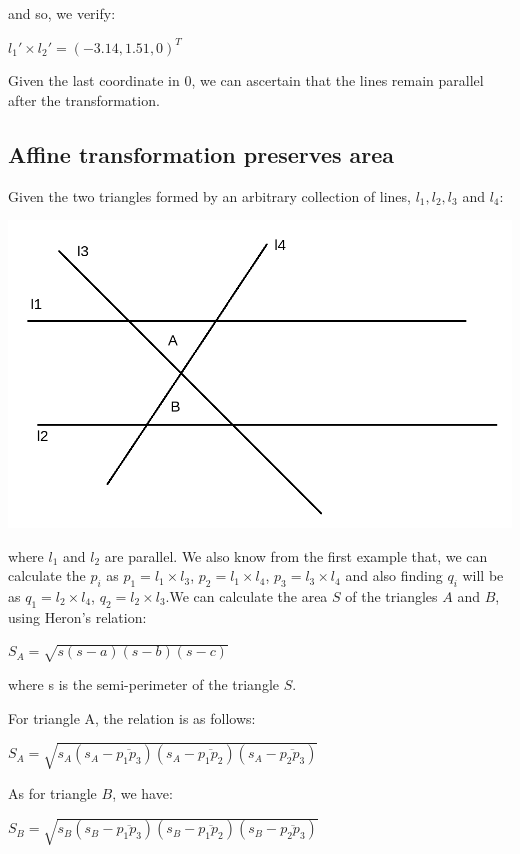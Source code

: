 \documentclass[]{article}
\begin{document}
\vspace{0.5em}

and so, we verify:

\centerline {
	$l_1' \times l_2'=(-3.14, 1.51, 0)^T$
}

Given the last coordinate in 0, we can ascertain that the lines remain parallel after the transformation.

\subsection{Affine transformation preserves area}

Given the two triangles formed by an arbitrary collection of lines, $l_1, l_2, l_3$ and $l_4$:

\centerline {
	\includegraphics[scale=0.3]{hw4}
}

where $l_1$ and $l_2$ are parallel. We also know from the first example that, we can calculate the $p_i$ as $p_1 = l_1 \times l_3$, $p_2 = l_1 \times l_4$, $p_3 = l_3 \times l_4$ and also finding $q_i$ will be as $q_1 = l_2 \times l_4$, $q_2 = l_2 \times l_3$.We can calculate the area $S$ of the triangles $A$ and $B$, using Heron's relation:

\centerline {
	$S_A = \sqrt{s(s-a)(s-b)(s-c)}$
} 

where s is the semi-perimeter of the triangle $S$.

For triangle A, the relation is as follows:

\centerline {
	$S_A=\sqrt{s_A(s_A - \overline{p_1p_3})(s_A - \overline{p_1p_2}) (s_A - \overline{p_2p_3})}$
}

As for triangle $B$, we have:

\centerline {
	$S_B=\sqrt{s_B(s_B - \overline{p_1p_3})(s_B - \overline{p_1p_2}) (s_B - \overline{p_2p_3})}$
}
\end{document}
